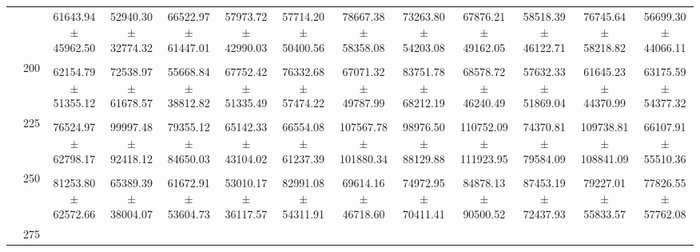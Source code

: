 \begin{table}[h]
{\begin{tabular}{
        ccccccccccccc}
 & & \cellcolor[HTML]{EFEFEF} 61643.94 $\pm$ 45962.50& \cellcolor[HTML]{EFEFEF} 52940.30 $\pm$ 32774.32& \cellcolor[HTML]{EFEFEF} 66522.97 $\pm$ 61447.01& \cellcolor[HTML]{EFEFEF} 57973.72 $\pm$ 42990.03& \cellcolor[HTML]{EFEFEF} 57714.20 $\pm$ 50400.56& \cellcolor[HTML]{EFEFEF} 78667.38 $\pm$ 58358.08& \cellcolor[HTML]{EFEFEF} 73263.80 $\pm$ 54203.08& \cellcolor[HTML]{EFEFEF} 67876.21 $\pm$ 49162.05& \cellcolor[HTML]{EFEFEF} 58518.39 $\pm$ 46122.71& \cellcolor[HTML]{EFEFEF} 76745.64 $\pm$ 58218.82& \cellcolor[HTML]{EFEFEF} 56699.30 $\pm$ 44066.11 \\ 
 & \multirow{2}{*}{200}& & & & & & & & & & &  \\ 
 & & 62154.79 $\pm$ 51355.12& 72538.97 $\pm$ 61678.57& 55668.84 $\pm$ 38812.82& 67752.42 $\pm$ 51335.49& 76332.68 $\pm$ 57474.22& 67071.32 $\pm$ 49787.99& 83751.78 $\pm$ 68212.19& 68578.72 $\pm$ 46240.49& 57632.33 $\pm$ 51869.04& 61645.23 $\pm$ 44370.99& 63175.59 $\pm$ 54377.32 \\ 
 & \multirow{2}{*}{225}& \cellcolor[HTML]{EFEFEF} & \cellcolor[HTML]{EFEFEF} & \cellcolor[HTML]{EFEFEF} & \cellcolor[HTML]{EFEFEF} & \cellcolor[HTML]{EFEFEF} & \cellcolor[HTML]{EFEFEF} & \cellcolor[HTML]{EFEFEF} & \cellcolor[HTML]{EFEFEF} & \cellcolor[HTML]{EFEFEF} & \cellcolor[HTML]{EFEFEF} & \cellcolor[HTML]{EFEFEF}  \\ 
 & & \cellcolor[HTML]{EFEFEF} 76524.97 $\pm$ 62798.17& \cellcolor[HTML]{EFEFEF} 99997.48 $\pm$ 92418.12& \cellcolor[HTML]{EFEFEF} 79355.12 $\pm$ 84650.03& \cellcolor[HTML]{EFEFEF} 65142.33 $\pm$ 43104.02& \cellcolor[HTML]{EFEFEF} 66554.08 $\pm$ 61237.39& \cellcolor[HTML]{EFEFEF} 107567.78 $\pm$ 101880.34& \cellcolor[HTML]{EFEFEF} 98976.50 $\pm$ 88129.88& \cellcolor[HTML]{EFEFEF} 110752.09 $\pm$ 111923.95& \cellcolor[HTML]{EFEFEF} 74370.81 $\pm$ 79584.09& \cellcolor[HTML]{EFEFEF} 109738.81 $\pm$ 108841.09& \cellcolor[HTML]{EFEFEF} 66107.91 $\pm$ 55510.36 \\ 
 & \multirow{2}{*}{250}& & & & & & & & & & &  \\ 
 & & 81253.80 $\pm$ 62572.66& 65389.39 $\pm$ 38004.07& 61672.91 $\pm$ 53604.73& 53010.17 $\pm$ 36117.57& 82991.08 $\pm$ 54311.91& 69614.16 $\pm$ 46718.60& 74972.95 $\pm$ 70411.41& 84878.13 $\pm$ 90500.52& 87453.19 $\pm$ 72437.93& 79227.01 $\pm$ 55833.57& 77826.55 $\pm$ 57762.08 \\ 
 & \multirow{2}{*}{275}& \cellcolor[HTML]{EFEFEF} & \cellcolor[HTML]{EFEFEF} & \cellcolor[HTML]{EFEFEF} & \cellcolor[HTML]{EFEFEF} & \cellcolor[HTML]{EFEFEF} & \cellcolor[HTML]{EFEFEF} & \cellcolor[HTML]{EFEFEF} & \cellcolor[HTML]{EFEFEF} & \cellcolor[HTML]{EFEFEF} & \cellcolor[HTML]{EFEFEF} & \cellcolor[HTML]{EFEFEF}  \\ 

\end{tabular}}
\end{table}
